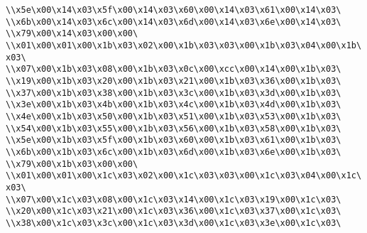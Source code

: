 \verb|\\x5e\x00\x14\x03\x5f\x00\x14\x03\x60\x00\x14\x03\x61\x00\x14\x03\|\newline
\verb|\\x6b\x00\x14\x03\x6c\x00\x14\x03\x6d\x00\x14\x03\x6e\x00\x14\x03\|\newline
\verb|\\x79\x00\x14\x03\x00\x00\|\newline
\verb|\\x01\x00\x01\x00\x1b\x03\x02\x00\x1b\x03\x03\x00\x1b\x03\x04\x00\x1b\x03\|\newline
\verb|\\x07\x00\x1b\x03\x08\x00\x1b\x03\x0c\x00\xcc\x00\x14\x00\x1b\x03\|\newline
\verb|\\x19\x00\x1b\x03\x20\x00\x1b\x03\x21\x00\x1b\x03\x36\x00\x1b\x03\|\newline
\verb|\\x37\x00\x1b\x03\x38\x00\x1b\x03\x3c\x00\x1b\x03\x3d\x00\x1b\x03\|\newline
\verb|\\x3e\x00\x1b\x03\x4b\x00\x1b\x03\x4c\x00\x1b\x03\x4d\x00\x1b\x03\|\newline
\verb|\\x4e\x00\x1b\x03\x50\x00\x1b\x03\x51\x00\x1b\x03\x53\x00\x1b\x03\|\newline
\verb|\\x54\x00\x1b\x03\x55\x00\x1b\x03\x56\x00\x1b\x03\x58\x00\x1b\x03\|\newline
\verb|\\x5e\x00\x1b\x03\x5f\x00\x1b\x03\x60\x00\x1b\x03\x61\x00\x1b\x03\|\newline
\verb|\\x6b\x00\x1b\x03\x6c\x00\x1b\x03\x6d\x00\x1b\x03\x6e\x00\x1b\x03\|\newline
\verb|\\x79\x00\x1b\x03\x00\x00\|\newline
\verb|\\x01\x00\x01\x00\x1c\x03\x02\x00\x1c\x03\x03\x00\x1c\x03\x04\x00\x1c\x03\|\newline
\verb|\\x07\x00\x1c\x03\x08\x00\x1c\x03\x14\x00\x1c\x03\x19\x00\x1c\x03\|\newline
\verb|\\x20\x00\x1c\x03\x21\x00\x1c\x03\x36\x00\x1c\x03\x37\x00\x1c\x03\|\newline
\verb|\\x38\x00\x1c\x03\x3c\x00\x1c\x03\x3d\x00\x1c\x03\x3e\x00\x1c\x03\|\newline
